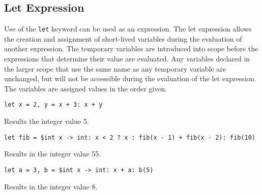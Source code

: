 
\subsection{Let Expression}
{
	Use of the \texttt{let} keyword can be used as an expression.
	The let expression allows the creation and assignment
	of short-lived variables
	during the evaluation of another expression.
	The temporary variables are introduced into scope before the expressions
	that determine their value are evaluated.
	Any variables declared in the larger scope that use the same name as
	any temporary variable are unchanged, but will not be accessible during
	the evaluation of the let expression.
	The variables are assigned values in the order given.
	
	\begin{itemize}
	{
		\item[] \texttt{let x = 2, y = x + 3: x + y}
		
			Results the integer value 5.
		
		\item[] \texttt{let fib = \$int x -> int: x < 2 ? x : fib(x - 1) + fib(x - 2): fib(10)}
		
			Results in the integer value 55.
		
		\item[] \texttt{let a = 3, b = \$int x -> int: x + a: b(5)}
		
			Results in the integer value 8.
	}
	\end{itemize}
}
